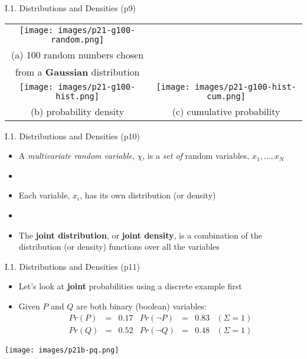 \documentclass[handout]{beamer}
\newcommand{\strong}[1]{\textbf{\color{teal} #1}}
\newcommand{\stronger}[1]{\textbf{\color{purple} #1}}
\begin{document}
\begin{frame}{I.1. Distributions and Densities (p9)}
\begin{center}
\begin{tabular}{cc}
\texttt{[image: images/p21-g100-random.png]} \\
(a) 100 random numbers chosen \\
from a \strong{Gaussian} distribution \\
\texttt{[image: images/p21-g100-hist.png]} &
\texttt{[image: images/p21-g100-hist-cum.png]} \\
(b) probability density & (c) cumulative probability \\
\end{tabular}
\end{center}
\end{frame}
\begin{frame}{I.1. Distributions and Densities (p10)}
\begin{itemize}
\item A \emph{multivariate random variable}, $\chi$, is a \emph{set of} random variables, $x_1, \ldots, x_N$
\item[]
\item Each variable, $x_i$, has its own distribution (or density)
\item[]
\item The \stronger{joint distribution}, or \stronger{joint density}, is a combination of the distribution (or density) functions over all the variables
\end{itemize}
\end{frame}
\begin{frame}{I.1. Distributions and Densities (p11)}
\begin{itemize}
\item Let's look at \strong{joint} probabilities using a discrete example first
\item Given $P$ and $Q$ are both binary (boolean) variables:
\[
\begin{array}{rcl|rcl|l}
Pr(P) & = & 0.17 & Pr(\neg P) & = & 0.83 & (\Sigma=1) \\
Pr(Q) & = & 0.52 & Pr(\neg Q) & = & 0.48 & (\Sigma=1)
\end{array}
\]
\end{itemize}
\begin{center}
\texttt{[image: images/p21b-pq.png]}
\end{center}
\end{frame}
\end{document}
